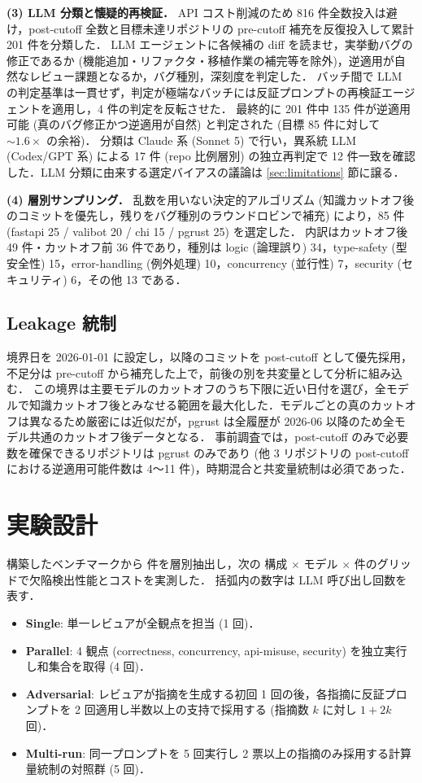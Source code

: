 \documentclass[a4j]{jarticle}
\begin{document}
\textbf{(3) LLM 分類と懐疑的再検証．}
API コスト削減のため 816 件全数投入は避け，post-cutoff 全数と目標未達リポジトリの pre-cutoff 補充を反復投入して累計 201 件を分類した．
LLM エージェントに各候補の diff を読ませ，実挙動バグの修正であるか (機能追加・リファクタ・移植作業の補完等を除外)，逆適用が自然なレビュー課題となるか，バグ種別，深刻度を判定した．
バッチ間で LLM の判定基準は一貫せず，判定が極端なバッチには反証プロンプトの再検証エージェントを適用し，4 件の判定を反転させた．
最終的に 201 件中 135 件が逆適用可能 (真のバグ修正かつ逆適用が自然) と判定された (目標 85 件に対して $\sim 1.6\times$ の余裕)．
分類は Claude 系 (Sonnet 5) で行い，異系統 LLM (Codex/GPT 系) による 17 件 (repo 比例層別) の独立再判定で 12 件一致を確認した．LLM 分類に由来する選定バイアスの議論は \ref{sec:limitations} 節に譲る．

\textbf{(4) 層別サンプリング．}
乱数を用いない決定的アルゴリズム (知識カットオフ後のコミットを優先し，残りをバグ種別のラウンドロビンで補充) により，85 件 (fastapi 25 / valibot 20 / chi 15 / pgrust 25) を選定した．
内訳はカットオフ後 49 件・カットオフ前 36 件であり，種別は logic (論理誤り) 34，type-safety (型安全性) 15，error-handling (例外処理) 10，concurrency (並行性) 7，security (セキュリティ) 6，その他 13 である．

\subsection{Leakage 統制}

境界日を 2026-01-01 に設定し，以降のコミットを post-cutoff として優先採用，不足分は pre-cutoff から補充した上で，前後の別を共変量として分析に組み込む．
この境界は主要モデルのカットオフのうち下限に近い日付を選び，全モデルで知識カットオフ後とみなせる範囲を最大化した．モデルごとの真のカットオフは異なるため厳密には近似だが，pgrust は全履歴が 2026-06 以降のため全モデル共通のカットオフ後データとなる．
事前調査では，post-cutoff のみで必要数を確保できるリポジトリは pgrust のみであり (他 3 リポジトリの post-cutoff における逆適用可能件数は 4〜11 件)，時期混合と共変量統制は必須であった．

\section{実験設計}

構築したベンチマークから \nItems{} 件を層別抽出し，次の \nConfigs{} 構成 $\times$ \nModels{} モデル $\times$ \nItems{} 件のグリッドで欠陥検出性能とコストを実測した．
括弧内の数字は LLM 呼び出し回数を表す．
\begin{itemize}
\setlength{\itemsep}{2pt}
\item \textbf{Single}: 単一レビュアが全観点を担当 (1 回)．
\item \textbf{Parallel}: 4 観点 (correctness, concurrency, api-misuse, security) を独立実行し和集合を取得 (4 回)．
\item \textbf{Adversarial}: レビュアが指摘を生成する初回 1 回の後，各指摘に反証プロンプトを 2 回適用し半数以上の支持で採用する (指摘数 $k$ に対し $1+2k$ 回)．
\item \textbf{Multi-run}: 同一プロンプトを 5 回実行し 2 票以上の指摘のみ採用する計算量統制の対照群 (5 回)．
\end{itemize}
\end{document}
